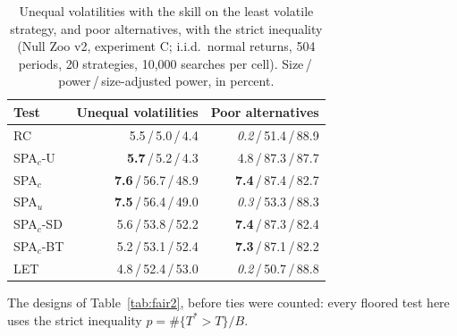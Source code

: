 \begin{table}[t]
\centering
\small
\caption{Unequal volatilities with the skill on the least volatile strategy, and poor alternatives, with the strict inequality (Null Zoo v2, experiment C; i.i.d.\ normal returns, 504 periods, 20 strategies, 10{,}000 searches per cell). Size\,/\,power\,/\,size-adjusted power, in percent.}
\label{tab:fair}
\begin{tabular}{lrr}
\toprule
Test & Unequal volatilities & Poor alternatives \\
\midrule
RC & 5.5\,/\,5.0\,/\,4.4 & \textit{0.2}\,/\,51.4\,/\,88.9 \\
SPA$_c$-U & \textbf{5.7}\,/\,5.2\,/\,4.3 & 4.8\,/\,87.3\,/\,87.7 \\
SPA$_c$ & \textbf{7.6}\,/\,56.7\,/\,48.9 & \textbf{7.4}\,/\,87.4\,/\,82.7 \\
SPA$_u$ & \textbf{7.5}\,/\,56.4\,/\,49.0 & \textit{0.3}\,/\,53.3\,/\,88.3 \\
SPA$_c$-SD & 5.6\,/\,53.8\,/\,52.2 & \textbf{7.4}\,/\,87.3\,/\,82.4 \\
SPA$_c$-BT & 5.2\,/\,53.1\,/\,52.4 & \textbf{7.3}\,/\,87.1\,/\,82.2 \\
LET & 4.8\,/\,52.4\,/\,53.0 & \textit{0.2}\,/\,50.7\,/\,88.8 \\
\bottomrule
\end{tabular}
\par\smallskip\begin{minipage}{0.97\linewidth}\footnotesize The designs of Table~\ref{tab:fair2}, before ties were counted: every floored test here uses the strict inequality $p=\#\{T^*>T\}/B$.\end{minipage}
\end{table}

